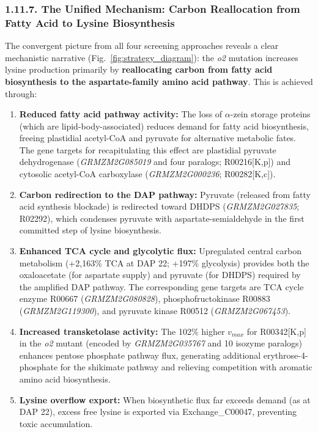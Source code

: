 \documentclass[12pt,a4paper]{article}
\begin{document}
\subsubsection{1.11.7. The Unified Mechanism: Carbon Reallocation from Fatty Acid to Lysine Biosynthesis}

The convergent picture from all four screening approaches reveals a clear mechanistic narrative (Fig.~\ref{fig:strategy_diagram}): the \textit{o2} mutation increases lysine production primarily by \textbf{reallocating carbon from fatty acid biosynthesis to the aspartate-family amino acid pathway}. This is achieved through:

\begin{enumerate}
    \item \textbf{Reduced fatty acid pathway activity:} The loss of $\alpha$-zein storage proteins (which are lipid-body-associated) reduces demand for fatty acid biosynthesis, freeing plastidial acetyl-CoA and pyruvate for alternative metabolic fates. The gene targets for recapitulating this effect are plastidial pyruvate dehydrogenase (\textit{GRMZM2G085019} and four paralogs; R00216[K,p]) and cytosolic acetyl-CoA carboxylase (\textit{GRMZM2G000236}; R00282[K,c]).
    
    \item \textbf{Carbon redirection to the DAP pathway:} Pyruvate (released from fatty acid synthesis blockade) is redirected toward DHDPS (\textit{GRMZM2G027835}; R02292), which condenses pyruvate with aspartate-semialdehyde in the first committed step of lysine biosynthesis.
    
    \item \textbf{Enhanced TCA cycle and glycolytic flux:} Upregulated central carbon metabolism (+2,163\% TCA at DAP 22; +197\% glycolysis) provides both the oxaloacetate (for aspartate supply) and pyruvate (for DHDPS) required by the amplified DAP pathway. The corresponding gene targets are TCA cycle enzyme R00667 (\textit{GRMZM2G080828}), phosphofructokinase R00883 (\textit{GRMZM2G119300}), and pyruvate kinase R00512 (\textit{GRMZM2G067453}).
    
    \item \textbf{Increased transketolase activity:} The 102\% higher $v_{max}$ for R00342[K,p] in the \textit{o2} mutant (encoded by \textit{GRMZM2G035767} and 10 isozyme paralogs) enhances pentose phosphate pathway flux, generating additional erythrose-4-phosphate for the shikimate pathway and relieving competition with aromatic amino acid biosynthesis.
    
    \item \textbf{Lysine overflow export:} When biosynthetic flux far exceeds demand (as at DAP 22), excess free lysine is exported via Exchange\_C00047, preventing toxic accumulation.
\end{enumerate}
\end{document}
